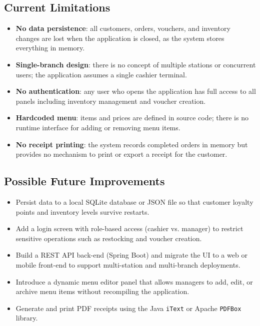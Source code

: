 \documentclass[11pt,a4paper]{article}
\begin{document}
\subsection{Current Limitations}
\begin{itemize}[leftmargin=*]
    \item \textbf{No data persistence}: all customers, orders, vouchers, and inventory changes are lost when the application is closed, as the system stores everything in memory.
    \item \textbf{Single-branch design}: there is no concept of multiple stations or concurrent users; the application assumes a single cashier terminal.
    \item \textbf{No authentication}: any user who opens the application has full access to all panels including inventory management and voucher creation.
    \item \textbf{Hardcoded menu}: items and prices are defined in source code; there is no runtime interface for adding or removing menu items.
    \item \textbf{No receipt printing}: the system records completed orders in memory but provides no mechanism to print or export a receipt for the customer.
\end{itemize}

\subsection{Possible Future Improvements}
\begin{itemize}[leftmargin=*]
    \item Persist data to a local SQLite database or JSON file so that customer loyalty points and inventory levels survive restarts.
    \item Add a login screen with role-based access (cashier vs. manager) to restrict sensitive operations such as restocking and voucher creation.
    \item Build a REST API back-end (Spring Boot) and migrate the UI to a web or mobile front-end to support multi-station and multi-branch deployments.
    \item Introduce a dynamic menu editor panel that allows managers to add, edit, or archive menu items without recompiling the application.
    \item Generate and print PDF receipts using the Java \texttt{iText} or Apache \texttt{PDFBox} library.
\end{itemize}
\end{document}
